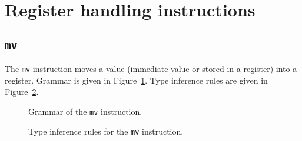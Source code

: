 \section{Register handling instructions}\label{sec:nstar-instructionset-registers}

\subsection{\texttt{mv}}\label{subsec:nstar-instructionset-registers-mv}

The \texttt{mv} instruction moves a value (immediate value or stored in a register) into a register.
Grammar is given in Figure~\ref{fig:nstar-instructionset-registers-mv-grammar}.
Type inference rules are given in Figure~\ref{fig:nstar-instructionset-registers-mv-typerules}.

\begin{figure}[H]
  \centering


  \caption{Grammar of the \texttt{mv} instruction.}
  \label{fig:nstar-instructionset-registers-mv-grammar}
\end{figure}

\begin{figure}[H]
  \centering


  \caption{Type inference rules for the \texttt{mv} instruction.}
  \label{fig:nstar-instructionset-registers-mv-typerules}
\end{figure}

